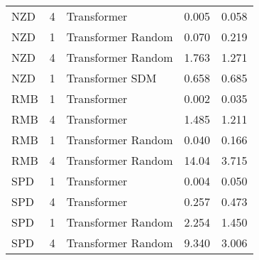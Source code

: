 \begin{tabular}{lrlll}
 NZD &          4 & Transformer & 0.005 & 0.058 \\
 NZD &          1 &    Transformer Random & 0.070 & 0.219 \\
 NZD &          4 &    Transformer Random & 1.763 & 1.271 \\
 NZD &          1 &    Transformer SDM & 0.658 & 0.685 \\
 RMB &          1 & Transformer & 0.002 & 0.035 \\
 RMB &          4 & Transformer & 1.485 & 1.211 \\
 RMB &          1 &    Transformer Random & 0.040 & 0.166 \\
 RMB &          4 &    Transformer Random & 14.04 & 3.715 \\
 SPD &          1 & Transformer & 0.004 & 0.050 \\
 SPD &          4 & Transformer & 0.257 & 0.473 \\
 SPD &          1 &    Transformer Random & 2.254 & 1.450 \\
 SPD &          4 &    Transformer Random & 9.340 & 3.006 \\
\bottomrule
\end{tabular}
